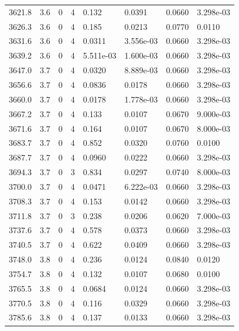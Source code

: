 \documentclass[preview]{standalone}
\begin{document}
{{{{{{{{{{{{{{{{\begin{tabular}{L{1.2cm}C{1.2cm} C{0.3cm}C{0.5cm} C{1.4cm}C{1.4cm} C{1.4cm}C{1.4cm}}
  3621.8  &   3.6  & 0     &  4 &  0.132  & 0.0391  & 0.0660 &  3.298e-03   \\ 
  3626.3  &   3.6  & 0     &  4 &  0.185  & 0.0213  & 0.0770 &  0.0110   \\ 
  3631.6  &   3.6  & 0     &  4 &  0.0311  & 3.556e-03  & 0.0660 &  3.298e-03   \\ 
  3639.2  &   3.6  & 0     &  4 &  5.511e-03  & 1.600e-03  & 0.0660 &  3.298e-03   \\ 
  3647.0  &   3.7  & 0     &  4 &  0.0320  & 8.889e-03  & 0.0660 &  3.298e-03   \\ 
  3656.6  &   3.7  & 0     &  4 &  0.0836  & 0.0178  & 0.0660 &  3.298e-03   \\ 
  3660.0  &   3.7  & 0     &  4 &  0.0178  & 1.778e-03  & 0.0660 &  3.298e-03   \\ 
  3667.2  &   3.7  & 0     &  4 &  0.133  & 0.0107  & 0.0670 &  9.000e-03   \\ 
  3671.6  &   3.7  & 0     &  4 &  0.164  & 0.0107  & 0.0670 &  8.000e-03   \\ 
  3683.7  &   3.7  & 0     &  4 &  0.852  & 0.0320  & 0.0760 &  0.0100   \\ 
  3687.7  &   3.7  & 0     &  4 &  0.0960  & 0.0222  & 0.0660 &  3.298e-03   \\ 
  3694.3  &   3.7  & 0     &  3 &  0.834  & 0.0297  & 0.0740 &  8.000e-03   \\ 
  3700.0  &   3.7  & 0     &  4 &  0.0471  & 6.222e-03  & 0.0660 &  3.298e-03   \\ 
  3708.3  &   3.7  & 0     &  4 &  0.153  & 0.0142  & 0.0660 &  3.298e-03   \\ 
  3711.8  &   3.7  & 0     &  3 &  0.238  & 0.0206  & 0.0620 &  7.000e-03   \\ 
  3737.6  &   3.7  & 0     &  4 &  0.578  & 0.0373  & 0.0660 &  3.298e-03   \\ 
  3740.5  &   3.7  & 0     &  4 &  0.622  & 0.0409  & 0.0660 &  3.298e-03   \\ 
  3748.0  &   3.8  & 0     &  4 &  0.236  & 0.0124  & 0.0840 &  0.0120   \\ 
  3754.7  &   3.8  & 0     &  4 &  0.132  & 0.0107  & 0.0680 &  0.0100   \\ 
  3765.5  &   3.8  & 0     &  4 &  0.0684  & 0.0124  & 0.0660 &  3.298e-03   \\ 
  3770.5  &   3.8  & 0     &  4 &  0.116  & 0.0329  & 0.0660 &  3.298e-03   \\ 
  3785.6  &   3.8  & 0     &  4 &  0.137  & 0.0133  & 0.0660 &  3.298e-03   \\ 

\end{tabular}}}}}}}}}}}}}}}}}
\end{document}

